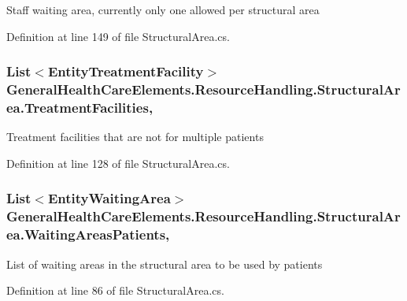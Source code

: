 Staff waiting area, currently only one allowed per structural area 



Definition at line 149 of file Structural\+Area.\+cs.

\subsubsection[{\texorpdfstring{Treatment\+Facilities}{TreatmentFacilities}}]{\setlength{\rightskip}{0pt plus 5cm}List$<${\bf Entity\+Treatment\+Facility}$>$ General\+Health\+Care\+Elements.\+Resource\+Handling.\+Structural\+Area.\+Treatment\+Facilities\hspace{0.3cm}{\ttfamily [get]}, {\ttfamily [set]}}\hypertarget{class_general_health_care_elements_1_1_resource_handling_1_1_structural_area_a61932e45a40e44fa345468a334a82100}{}\label{class_general_health_care_elements_1_1_resource_handling_1_1_structural_area_a61932e45a40e44fa345468a334a82100}


Treatment facilities that are not for multiple patients 



Definition at line 128 of file Structural\+Area.\+cs.

\subsubsection[{\texorpdfstring{Waiting\+Areas\+Patients}{WaitingAreasPatients}}]{\setlength{\rightskip}{0pt plus 5cm}List$<${\bf Entity\+Waiting\+Area}$>$ General\+Health\+Care\+Elements.\+Resource\+Handling.\+Structural\+Area.\+Waiting\+Areas\+Patients\hspace{0.3cm}{\ttfamily [get]}, {\ttfamily [set]}}\hypertarget{class_general_health_care_elements_1_1_resource_handling_1_1_structural_area_adc31097b95a216a3677a17f2bb42b9c3}{}\label{class_general_health_care_elements_1_1_resource_handling_1_1_structural_area_adc31097b95a216a3677a17f2bb42b9c3}


List of waiting areas in the structural area to be used by patients 



Definition at line 86 of file Structural\+Area.\+cs.

